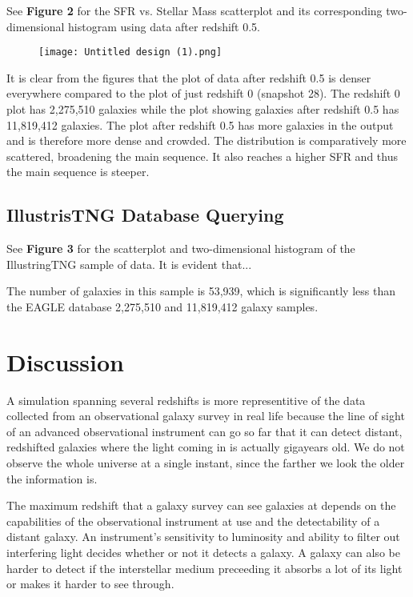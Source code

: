 \documentclass[linenumbers,trackchanges]{aastex7}
\begin{document}
See \textbf{Figure 2 }for the SFR vs. Stellar Mass scatterplot and its corresponding two-dimensional histogram using data after redshift 0.5. 

\begin{figure}[h]
    \centering
    \texttt{[image: Untitled design (1).png]}
    \caption{}
\end{figure}
 

It is clear from the figures that the plot of data after redshift 0.5 is denser everywhere compared to the plot of just redshift 0 (snapshot 28). The redshift 0 plot has 2,275,510 galaxies while the plot showing galaxies after redshift 0.5 has 11,819,412 galaxies. The plot after redshift 0.5 has more galaxies in the output and is therefore more dense and crowded. The distribution is comparatively more scattered, broadening the main sequence. It also reaches a higher SFR and thus the main sequence is steeper.

\subsection{IllustrisTNG Database Querying }
See\textbf{ Figure 3} for the scatterplot and two-dimensional histogram of the IllustringTNG sample of data. It is evident that... 
\medskip

The number of galaxies in this sample is 53,939, which is significantly less than the EAGLE database 2,275,510 and 11,819,412 galaxy samples. 

\section{Discussion}
A simulation spanning several redshifts is more representitive of the data collected from an observational galaxy survey in real life because the line of sight of an advanced observational instrument can go so far that it can detect distant, redshifted galaxies where the light coming in is actually gigayears old. We do not observe the whole universe at a single instant, since the farther we look the older the information is.
\medskip

The maximum redshift that a galaxy survey can see galaxies at depends on the capabilities of the observational instrument at use and the detectability of a distant galaxy. An instrument's sensitivity to luminosity and ability to filter out interfering light decides whether or not it detects a galaxy. A galaxy can also be harder to detect if the interstellar medium preceeding it absorbs a lot of its light or makes it harder to see through.
\end{document}
